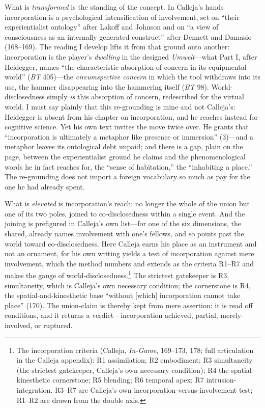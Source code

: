 \documentclass{article}
\begin{document}
What is \textit{transformed} is the standing of the concept. In Calleja's hands incorporation is a psychological intensification of involvement, set on ``their experientialist ontology'' after Lakoff and Johnson and on ``a view of consciousness as an internally generated construct'' after Dennett and Damasio (168--169). The reading I develop lifts it from that ground onto another: incorporation is the player's \textit{dwelling} in the designed \textit{Umwelt}---what Part I, after Heidegger, names ``the characteristic absorption of concern in its equipmental world'' (\textit{BT} 405)---the \textit{circumspective concern} in which the tool withdraws into its use, the hammer disappearing into the hammering itself (\textit{BT} 98). World-disclosedness simply \textit{is} this absorption of concern, redescribed for the virtual world. I must say plainly that this re-grounding is mine and not Calleja's: Heidegger is absent from his chapter on incorporation, and he reaches instead for cognitive science. Yet his own text invites the move twice over. He grants that ``incorporation is ultimately a metaphor like presence or immersion'' (3)---and a metaphor leaves its ontological debt unpaid; and there is a gap, plain on the page, between the experientialist ground he claims and the phenomenological words he in fact reaches for, the ``sense of habitation,'' the ``inhabiting a place.'' The re-grounding does not import a foreign vocabulary so much as pay for the one he had already spent.

What is \textit{elevated} is incorporation's reach: no longer the whole of the union but one of its two poles, joined to co-disclosedness within a single event. And the joining is prefigured in Calleja's own list---for one of the six dimensions, the shared, already names involvement with one's fellows, and so points past the world toward co-disclosedness. Here Calleja earns his place as an instrument and not an ornament, for his own writing yields a test of incorporation against mere involvement, which the method numbers and extends as the criteria R1--R7 and makes the gauge of world-disclosedness.\footnote{The incorporation criteria (Calleja, \textit{In-Game}, 169--173, 178; full articulation in the Calleja appendix): R1 assimilation; R2 embodiment; R3 simultaneity (the strictest gatekeeper, Calleja's own necessary condition); R4 the spatial-kinesthetic cornerstone; R5 blending; R6 temporal apex; R7 intrusion-integration. R3--R7 are Calleja's own incorporation-versus-involvement test; R1--R2 are drawn from the double axis.} The strictest gatekeeper is R3, simultaneity, which is Calleja's own necessary condition; the cornerstone is R4, the spatial-and-kinesthetic base ``without [which] incorporation cannot take place'' (170). The union-claim is thereby kept from mere assertion: it is read off conditions, and it returns a verdict---incorporation achieved, partial, merely-involved, or ruptured.
\end{document}
